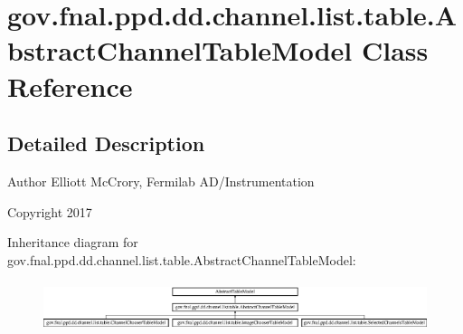 \hypertarget{classgov_1_1fnal_1_1ppd_1_1dd_1_1channel_1_1list_1_1table_1_1AbstractChannelTableModel}{\section{gov.\-fnal.\-ppd.\-dd.\-channel.\-list.\-table.\-Abstract\-Channel\-Table\-Model Class Reference}
\label{classgov_1_1fnal_1_1ppd_1_1dd_1_1channel_1_1list_1_1table_1_1AbstractChannelTableModel}
}


\subsection{Detailed Description}
\begin{DoxyAuthor}{Author}
Elliott Mc\-Crory, Fermilab A\-D/\-Instrumentation 
\end{DoxyAuthor}
\begin{DoxyCopyright}{Copyright}
2017 
\end{DoxyCopyright}
Inheritance diagram for gov.\-fnal.\-ppd.\-dd.\-channel.\-list.\-table.\-Abstract\-Channel\-Table\-Model\-:\begin{figure}[H]
\begin{center}
\leavevmode
\includegraphics[height=1.473684cm]{classgov_1_1fnal_1_1ppd_1_1dd_1_1channel_1_1list_1_1table_1_1AbstractChannelTableModel}
\end{center}
\end{figure}

